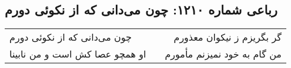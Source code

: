 \begin{center}
\section*{رباعی شماره ۱۲۱۰: چون می‌دانی که از نکوئی دورم}
\label{sec:1210}
\begin{longtable}{l p{0.5cm} r}
چون می‌دانی که از نکوئی دورم
&&
گر بگریزم ز نیکوان معذورم
\\
او همچو عصا کش است و من نابینا
&&
من گام به خود نمیزنم مأمورم
\\
\end{longtable}
\end{center}
